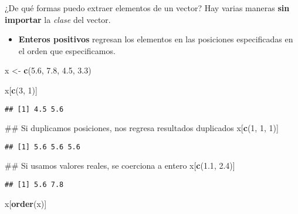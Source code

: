 \documentclass[]{article}
\newenvironment{Shaded}{\begin{snugshade}}{\end{snugshade}}
\newcommand{\KeywordTok}[1]{\textcolor[rgb]{0.13,0.29,0.53}{\textbf{#1}}}
\newcommand{\DecValTok}[1]{\textcolor[rgb]{0.00,0.00,0.81}{#1}}
\newcommand{\FloatTok}[1]{\textcolor[rgb]{0.00,0.00,0.81}{#1}}
\newcommand{\StringTok}[1]{\textcolor[rgb]{0.31,0.60,0.02}{#1}}
\newcommand{\NormalTok}[1]{#1}
\providecommand{\tightlist}{%
  \setlength{\itemsep}{0pt}\setlength{\parskip}{0pt}}
\begin{document}
¿De qué formas puedo extraer elementos de un vector? Hay varias maneras
\textbf{sin importar} la \emph{clase} del vector.

\begin{itemize}
\tightlist
\item
  \textbf{Enteros positivos} regresan los elementos en las posiciones
  especificadas en el orden que especificamos.
\end{itemize}

\begin{Shaded}
\begin{Highlighting}[]
\NormalTok{x <-}\StringTok{ }\KeywordTok{c}\NormalTok{(}\FloatTok{5.6}\NormalTok{, }\FloatTok{7.8}\NormalTok{, }\FloatTok{4.5}\NormalTok{, }\FloatTok{3.3}\NormalTok{)}

\NormalTok{x[}\KeywordTok{c}\NormalTok{(}\DecValTok{3}\NormalTok{, }\DecValTok{1}\NormalTok{)]}
\end{Highlighting}
\end{Shaded}

\begin{verbatim}
## [1] 4.5 5.6
\end{verbatim}

\begin{Shaded}
\begin{Highlighting}[]
\NormalTok{## Si duplicamos posiciones, nos regresa resultados duplicados}
\NormalTok{x[}\KeywordTok{c}\NormalTok{(}\DecValTok{1}\NormalTok{, }\DecValTok{1}\NormalTok{, }\DecValTok{1}\NormalTok{)]}
\end{Highlighting}
\end{Shaded}

\begin{verbatim}
## [1] 5.6 5.6 5.6
\end{verbatim}

\begin{Shaded}
\begin{Highlighting}[]
\NormalTok{## Si usamos valores reales, se coerciona a entero}
\NormalTok{x[}\KeywordTok{c}\NormalTok{(}\FloatTok{1.1}\NormalTok{, }\FloatTok{2.4}\NormalTok{)]}
\end{Highlighting}
\end{Shaded}

\begin{verbatim}
## [1] 5.6 7.8
\end{verbatim}

\begin{Shaded}
\begin{Highlighting}[]
\NormalTok{x[}\KeywordTok{order}\NormalTok{(x)]}
\end{Highlighting}
\end{Shaded}
\end{document}
